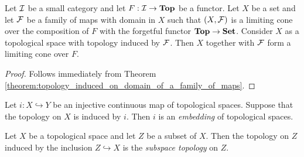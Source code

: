 \begin{corollary}\label{corollary:limits_in_category_of_topological_spaces}
	Let ${\mathcal I}$ be a small category and let $F:{\mathcal I} \rightarrow \mathbf{Top}$ be a functor. Let $X$ be a set and let ${\mathcal F}$ be a family of maps with domain in $X$ such that $(X,{\mathcal F})$ is a limiting cone over the composition of $F$ with the forgetful functor $\mathbf{Top} \rightarrow \mathbf{Set}$. Consider $X$ as a topological space with topology induced by ${\mathcal F}$. Then $X$ together with ${\mathcal F}$ form a limiting cone over $F$.
\end{corollary}
\begin{proof}
	Follows immediately from Theorem \ref{theorem:topology_induced_on_domain_of_a_family_of_maps}.
\end{proof}

\begin{definition}
	Let $i:X\hookrightarrow Y$ be an injective continuous map of topological spaces. Suppose that the topology on $X$ is induced by $i$. Then $i$ is an \textit{embedding} of topological spaces.
\end{definition}

\begin{definition}
	Let $X$ be a topological space and let $Z$ be a subset of $X$. Then the topology on $Z$ induced by the inclusion $Z \hookrightarrow X$ is the \textit{subspace topology} on $Z$.
\end{definition}


